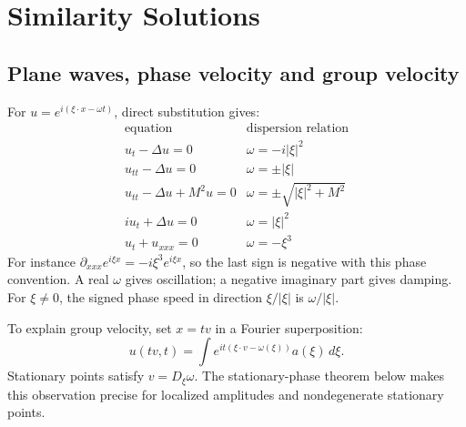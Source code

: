 \Needspace{65mm}
\section{Similarity Solutions}\label{sec:4-2}
\Needspace{35mm}
\subsection{Plane waves, phase velocity and group velocity}
For $u=e^{i(\xi\cdot x-\omega t)}$, direct substitution gives:
\[
\begin{array}{c|c}
 \text{equation}&\text{dispersion relation}\\ \hline
 u_t-\Delta u=0&\omega=-i|\xi|^2\\
 u_{tt}-\Delta u=0&\omega=\pm|\xi|\\
 u_{tt}-\Delta u+M^2u=0&\omega=\pm\sqrt{|\xi|^2+M^2}\\
 iu_t+\Delta u=0&\omega=|\xi|^2\\
 u_t+u_{xxx}=0&\omega=-\xi^3
\end{array}
\]
For instance $\partial_{xxx}e^{i\xi x}=-i\xi^3e^{i\xi x}$,
so the last sign is negative with this phase convention.
A real $\omega$ gives oscillation; a negative imaginary part gives damping.
For $\xi\ne0$, the signed phase speed in direction $\xi/|\xi|$
is $\omega/|\xi|$.

To explain group velocity, set $x=tv$ in a Fourier superposition:
\[
 u(tv,t)=\int e^{it(\xi\cdot v-\omega(\xi))}a(\xi)\,d\xi .
\]
Stationary points satisfy $v=D_\xi\omega$. The stationary-phase
theorem below makes this observation precise for localized amplitudes
and nondegenerate stationary points.
\Needspace{45mm}

\Needspace{35mm}
